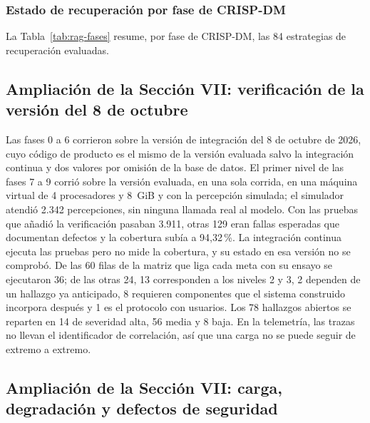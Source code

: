 \subsubsection{Estado de recuperación por fase de CRISP-DM}

La Tabla~\ref{tab:rag-fases} resume, por fase de CRISP-DM, las 84 estrategias de recuperación evaluadas.


\subsection*{Ampliación de la Sección VII: verificación de la versión del 8 de octubre}

Las fases 0 a 6 corrieron sobre la versión de integración del 8 de octubre de 2026, cuyo código de
producto es el mismo de la versión evaluada salvo la integración continua y dos valores por omisión
de la base de datos. El primer nivel de las fases 7 a 9 corrió sobre la versión evaluada, en una
sola corrida, en una máquina virtual de 4 procesadores y 8~GiB y con la percepción simulada; el
simulador atendió 2.342 percepciones, sin ninguna llamada real al modelo. Con las pruebas que añadió
la verificación pasaban 3.911, otras 129 eran fallas esperadas que documentan defectos y la
cobertura subía a 94,32\,\%. La integración continua ejecuta las pruebas pero no mide la cobertura,
y su estado en esa versión no se comprobó. De las 60 filas de la matriz que liga cada meta con su
ensayo se ejecutaron 36; de las otras 24, 13 corresponden a los niveles 2 y 3, 2 dependen de un
hallazgo ya anticipado, 8 requieren componentes que el sistema construido incorpora después y 1 es
el protocolo con usuarios. Los 78 hallazgos abiertos se reparten en 14 de severidad alta, 56 media
y 8 baja. En la telemetría, las trazas no llevan el identificador de correlación, así que una carga
no se puede seguir de extremo a extremo.

\subsection*{Ampliación de la Sección VII: carga, degradación y defectos de seguridad}

